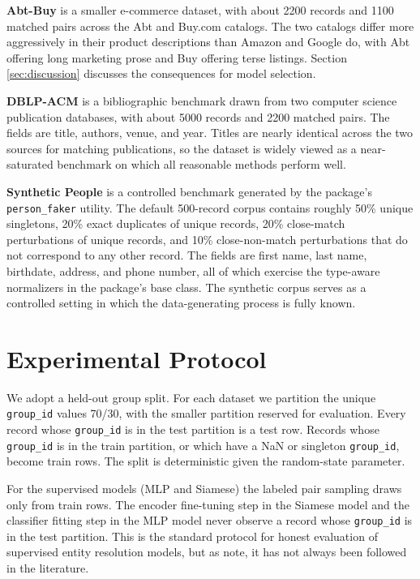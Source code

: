 \documentclass[10pt,letterpaper]{article}
\begin{document}
\textbf{Abt-Buy} is a smaller e-commerce dataset, with about 2200
records and 1100 matched pairs across the Abt and Buy.com catalogs.
The two catalogs differ more aggressively in their product
descriptions than Amazon and Google do, with Abt offering long
marketing prose and Buy offering terse listings. Section
\ref{sec:discussion} discusses the consequences for model selection.

\textbf{DBLP-ACM} is a bibliographic benchmark drawn from two computer
science publication databases, with about 5000 records and 2200
matched pairs. The fields are title, authors, venue, and year. Titles
are nearly identical across the two sources for matching publications,
so the dataset is widely viewed as a near-saturated benchmark on which
all reasonable methods perform well.

\textbf{Synthetic People} is a controlled benchmark generated by the
package's \texttt{person\_faker} utility. The default 500-record
corpus contains roughly 50\% unique singletons, 20\% exact duplicates
of unique records, 20\% close-match perturbations of unique records,
and 10\% close-non-match perturbations that do not correspond to any
other record. The fields are first name, last name, birthdate,
address, and phone number, all of which exercise the type-aware
normalizers in the package's base class. The synthetic corpus serves
as a controlled setting in which the data-generating process is fully
known.

\section{Experimental Protocol}
\label{sec:protocol}

We adopt a held-out group split. For each dataset we partition the
unique \texttt{group\_id} values 70/30, with the smaller partition
reserved for evaluation. Every record whose \texttt{group\_id} is in
the test partition is a test row. Records whose \texttt{group\_id} is
in the train partition, or which have a NaN or singleton
\texttt{group\_id}, become train rows. The split is deterministic
given the random-state parameter.

For the supervised models (MLP and Siamese) the labeled pair sampling
draws only from train rows. The encoder fine-tuning step in the
Siamese model and the classifier fitting step in the MLP model never
observe a record whose \texttt{group\_id} is in the test partition.
This is the standard protocol for honest evaluation of supervised
entity resolution models, but as \citet{mudgal2018} note, it has not
always been followed in the literature.
\end{document}
